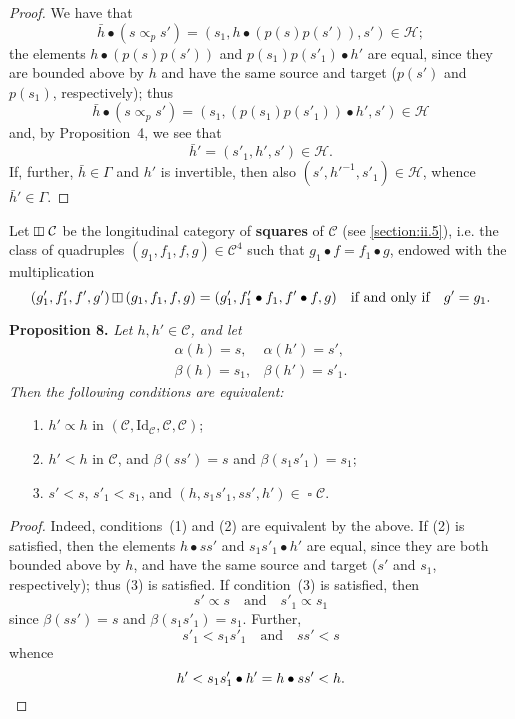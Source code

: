\documentclass[fleqn]{article}
\newenvironment{itenv}[1]
  {\phantomsection\par\medskip\noindent\textbf{#1.}\itshape}
  {\par\medskip}
\newcommand{\oldpage}[1]{\marginpar{\footnotesize$\Big\vert$ \textit{p.~#1}}}
\newcommand{\unsure}[1]{{\color{purple}\textbf{#1}}}
\newcommand{\CC}{\mathcal{C}}
\newcommand{\HH}{\mathcal{H}}
\newcommand{\subs}{\mathrel{\propto}}
\newcommand{\Id}{\mathrm{Id}}
\DeclareMathOperator{\sq}{\square}
\DeclareMathOperator{\vsq}{\raisebox{-.1em}{\rotatebox{90}{$\boxminus$}\,}}
\newcommand{\vmult}{\mathbin{\raisebox{-.1em}{\rotatebox{90}{$\boxminus$}}}}
\begin{document}
\begin{proof}
  We have that
  \[
    \bar{h}\bullet(s\subs_p s')
    = (s_1,h\bullet(p(s)p(s')),s')
    \in\HH;
  \]
  the elements $h\bullet(p(s)p(s'))$ and $p(s_1)p(s'_1)\bullet h'$ are equal, since they are bounded above by $h$ and have the same source and target ($p(s')$ and $p(s_1)$, respectively);
  thus
  \[
    \bar{h}\bullet(s\subs_p s')
    = (s_1,(p(s_1)p(s'_1))\bullet h',s')
    \in\HH
  \]
  and, by Proposition~4, we see that
  \[
    \bar{h}'
    = (s'_1,h',s')
    \in\HH.
  \]
  \oldpage{365}
  If, further, $\bar{h}\in\Gamma$ and $h'$ is invertible, then also $(s',h'^{-1},s'_1)\in\HH$, whence $\bar{h}'\in\Gamma$.
\end{proof}

Let $\vsq\CC$ be the longitudinal category of \unsure{squares} of $\CC$ (see \cref{section:ii.5}), i.e. the class of quadruples $(g_1,f_1,f,g)\in\CC^4$ such that $g_1\bullet f=f_1\bullet g$, endowed with the multiplication
\[
  (g'_1,f'_1,f',g')\vmult(g_1,f_1,f,g)
  = (g'_1,f'_1\bullet f_1,f'\bullet f,g)
  \quad\text{if and only if}\quad
  g'=g_1.
\]

\begin{itenv}{Proposition 8}
  Let $h,h'\in\CC$, and let
  \[
    \begin{array}{ll}
      \alpha(h)
      = s,
      &\alpha(h')
      = s',
    \\\beta(h)
      = s_1,
      &\beta(h')
      = s'_1.
    \end{array}
  \]
  Then the following conditions are equivalent:
  \begin{enumerate}
    \item[1.]
      $h'\subs h$ in $(\CC,\Id_\CC,\CC,\CC)$;
    \item[2.]
      $h'<h$ in $\CC$, and $\beta(ss')=s$ and $\beta(s_1s'_1)=s_1$;
    \item[3.]
      $s'<s$, $s'_1<s_1$, and $(h,s_1s'_1,ss',h')\in\sq\CC$.
  \end{enumerate}
\end{itenv}

\begin{proof}
  Indeed, conditions~(1) and (2) are equivalent by the above.
  If (2) is satisfied, then the elements $h\bullet ss'$ and $s_1s'_1\bullet h'$ are equal, since they are both bounded above by $h$, and have the same source and target ($s'$ and $s_1$, respectively);
  thus (3) is satisfied.
  If condition~(3) is satisfied, then
  \[
    s'\subs s
    \quad\text{and}\quad
    s'_1\subs s_1
  \]
  since $\beta(ss')=s$ and $\beta(s_1s'_1)=s_1$.
  Further,
  \[
    s'_1<s_1s'_1
    \quad\text{and}\quad
    ss'<s
  \]
  whence
  \[
    h'
    < s_1s'_1\bullet h'
    = h\bullet ss'
    < h.
    \qedhere
  \]
\end{proof}
\end{document}
